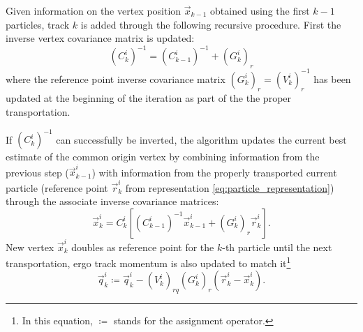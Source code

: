 Given information on the vertex position $\vec{x}_{k-1}$ obtained using the first $k-1$ particles, track $k$ is added through the following recursive procedure.
First the inverse vertex covariance matrix is updated:
\begin{equation}
{(C^i_k)}^{-1} = {(C^i_{k-1})}^{-1}
+
{(G_k^i)}_r
\label{eq:3:VF_new_inv_covmatrix}
\end{equation}
where the reference point inverse covariance matrix ${(G_k^i)}_r = {(V_k^i)}_r^{-1}$ has been updated at the beginning of the iteration as part of the the proper transportation.



If ${(C^i_k)}^{-1}$ can successfully be inverted, the algorithm updates the current best estimate of the common origin vertex by combining information from the previous step ($\vec{x}_{k-1}^i$) with information from the properly transported current particle (reference point $\vec{r}_k^i$ from representation \eqref{eq:particle_representation}) through the associate inverse covariance matrices:
\begin{equation}
\vec{x}_k^i = C_k^i \left[
	{(C^i_{k-1})}^{-1} \vec{x}_{k-1}^i
	+ {(G_k^i)}_r \vec{r}_k^i
\right].
\label{eq:VF_new_vertex_final}
\end{equation}
New vertex $\vec{x}_k^i$ doubles as reference point for the $k$-th particle until the next transportation, ergo track momentum is also updated to match it\footnote{In this equation, $\coloneqq$ stands for the assignment operator.}
\begin{equation}
	\vec{q}_k^i \coloneqq
	\vec{q}_k^i
	-
	{(V_k^i)}_{rq}
	{(G_k^i)}_r
	\left(
		\vec{r}_k^i - \vec{x}_k^i
	\right).
	\label{eq:VF_momentum_final}
\end{equation}

